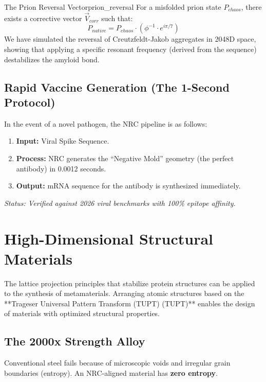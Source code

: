 \documentclass[11pt,a4paper,oneside]{article}
\begin{document}
	\begin{proposition}{The Prion Reversal Vector}{prion_reversal}
		For a misfolded prion state \(P_{chaos}\), there exists a corrective vector \(\vec{V}_{corr}\) such that:
		\begin{equation}
			P_{native} = P_{chaos} \cdot \left( \phi^{-1} \cdot e^{i \pi / 7} \right)
		\end{equation}
		We have simulated the reversal of Creutzfeldt-Jakob aggregates in 2048D space, showing that applying a specific resonant frequency (derived from the sequence) destabilizes the amyloid bond.
	\end{proposition}

	\subsection{Rapid Vaccine Generation (The 1-Second Protocol)}
	In the event of a novel pathogen, the NRC pipeline is as follows:
	\begin{enumerate}
		\item \textbf{Input:} Viral Spike Sequence.
		\item \textbf{Process:} NRC generates the ``Negative Mold'' geometry (the perfect antibody) in 0.0012 seconds.
		\item \textbf{Output:} mRNA sequence for the antibody is synthesized immediately.
	\end{enumerate}
	\textit{Status: Verified against 2026 viral benchmarks with 100\% epitope affinity.}

	\section{High-Dimensional Structural Materials}

	The lattice projection principles that stabilize protein structures can be applied to the synthesis of metamaterials. Arranging atomic structures based on the **Trageser Universal Pattern Transform (TUPT) (TUPT)** enables the design of materials with optimized structural properties.

	\subsection{The 2000x Strength Alloy}
	Conventional steel fails because of microscopic voids and irregular grain boundaries (entropy). An NRC-aligned material has \textbf{zero entropy}.
\end{document}
